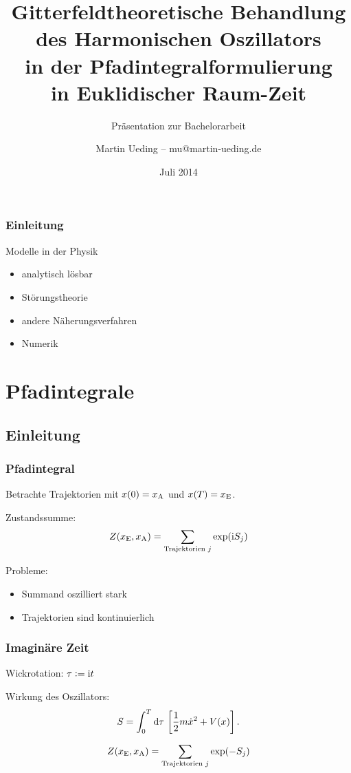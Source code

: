\documentclass[ngerman, fleqn]{beamer}
\title{%
    Gitterfeldtheoretische Behandlung\\
    des Harmonischen Oszillators\\
    in der Pfadintegralformulierung\\
    in Euklidischer Raum-Zeit
}
\subtitle{Präsentation zur Bachelorarbeit}
\author{Martin Ueding – mu@martin-ueding.de}
\date{Juli 2014}
\renewcommand\iup{\text i}
\begin{document}
\begin{frame}
    \titlepage
\end{frame}

\begin{frame}
    \frametitle{Einleitung}

    Modelle in der Physik

    \begin{itemize}
        \item
            analytisch lösbar
        \item
            Störungstheorie
        \item
            andere Näherungsverfahren
        \item
            Numerik
    \end{itemize}
\end{frame}

\begin{frame}
    \tableofcontents
\end{frame}

\section{Pfadintegrale}

\subsection{Einleitung}

\begin{frame}
    \frametitle{Pfadintegral}

    Betrachte Trajektorien mit $x(0) = x_\text A$ und $x(T) = x_\text E$.

    Zustandssumme:
    \[
        Z(x_\text E, x_\text A) = \sum_{\text{Trajektorien $j$}} \exp(\iup S_j)
    \]

    Probleme:
    \begin{itemize}
        \item Summand oszilliert stark
        \item Trajektorien sind kontinuierlich
    \end{itemize}
\end{frame}

\begin{frame}
    \frametitle{Imaginäre Zeit}

    Wickrotation: $\tau := \iup t$

    Wirkung des Oszillators:
    \[
        S = \int_0^T \dif \tau \, \sbr{\frac 12 m \dot x^2 + V(x)}.
    \]

    \[
        Z(x_\text E, x_\text A) = \sum_{\text{Trajektorien $j$}} \exp(- S_j)
    \]
\end{frame}
\end{document}
